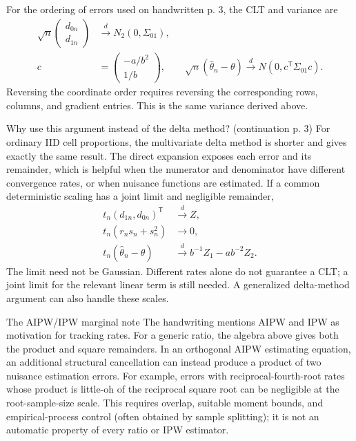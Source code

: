 \documentclass[12pt]{article}
\begin{document}
For the ordering of errors used on handwritten p. 3, the CLT and variance are
\begin{align}
 \sqrt n\begin{pmatrix}d_{0n}\\d_{1n}\end{pmatrix}
 &\xrightarrow{d}N_2(0,\Sigma_{01}),\\
 c&=\begin{pmatrix}-a/b^2\\1/b\end{pmatrix},\qquad
 \sqrt n(\widehat\theta_n-\theta)\xrightarrow{d}
 N(0,c^{\mathsf T}\Sigma_{01}c).
\end{align}
Reversing the coordinate order requires reversing the corresponding rows,
columns, and gradient entries. This is the same variance derived above.

\begin{todobox}{Why use this argument instead of the delta method? (continuation p. 3)}
For ordinary IID cell proportions, the multivariate delta method is shorter
and gives exactly the same result. The direct expansion exposes each error
and its remainder, which is helpful when the numerator and denominator
have different convergence rates, or when nuisance functions are estimated.
If a common deterministic scaling has a joint limit and negligible remainder,
\begin{align}
 t_n(d_{1n},d_{0n})^{\mathsf T}&\xrightarrow{d}Z,\\
 t_n(r_ns_n+s_n^2)&\longrightarrow0,\\
 t_n(\widehat\theta_n-\theta)&\xrightarrow{d}
 b^{-1}Z_1-ab^{-2}Z_2.
\end{align}
The limit need not be Gaussian. Different rates alone do not guarantee a
CLT; a joint limit for the relevant linear term is still needed. A generalized
delta-method argument can also handle these scales.
\end{todobox}
\begin{conceptbox}{The AIPW/IPW marginal note}
The handwriting mentions AIPW and IPW as motivation for tracking rates.
For a generic ratio, the algebra above gives both the product and square
remainders. In an orthogonal AIPW estimating equation, an additional
structural cancellation can instead produce a product of two nuisance
estimation errors. For example, errors with reciprocal-fourth-root rates
whose product is little-oh of the reciprocal square root can be negligible
at the root-sample-size scale. This requires overlap, suitable moment
bounds, and empirical-process control (often obtained by sample splitting);
it is not an automatic property of every ratio or IPW estimator.
\end{conceptbox}
\end{document}
